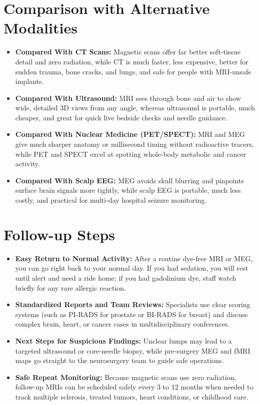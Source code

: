\section{Comparison with Alternative Modalities}
\begin{itemize}
  \item \textbf{Compared With CT Scans:} Magnetic scans offer far better soft-tissue detail and zero radiation, while CT is much faster, less expensive, better for sudden trauma, bone cracks, and lungs, and safe for people with MRI-unsafe implants.
  \item \textbf{Compared With Ultrasound:} MRI sees through bone and air to show wide, detailed 3D views from any angle, whereas ultrasound is portable, much cheaper, and great for quick live bedside checks and needle guidance.
  \item \textbf{Compared With Nuclear Medicine (PET/SPECT):} MRI and MEG give much sharper anatomy or millisecond timing without radioactive tracers, while PET and SPECT excel at spotting whole-body metabolic and cancer activity.
  \item \textbf{Compared With Scalp EEG:} MEG avoids skull blurring and pinpoints surface brain signals more tightly, while scalp EEG is portable, much less costly, and practical for multi-day hospital seizure monitoring.
\end{itemize}

\section{Follow-up Steps}
\begin{itemize}
  \item \textbf{Easy Return to Normal Activity:} After a routine dye-free MRI or MEG, you can go right back to your normal day. If you had sedation, you will rest until alert and need a ride home; if you had gadolinium dye, staff watch briefly for any rare allergic reaction.
  \item \textbf{Standardized Reports and Team Reviews:} Specialists use clear scoring systems (such as PI-RADS for prostate or BI-RADS for breast) and discuss complex brain, heart, or cancer cases in multidisciplinary conferences.
  \item \textbf{Next Steps for Suspicious Findings:} Unclear lumps may lead to a targeted ultrasound or core-needle biopsy, while pre-surgery MEG and fMRI maps go straight to the neurosurgery team to guide safe operations.
  \item \textbf{Safe Repeat Monitoring:} Because magnetic scans use zero radiation, follow-up MRIs can be scheduled safely every 3 to 12 months when needed to track multiple sclerosis, treated tumors, heart conditions, or childhood care.
\end{itemize}

